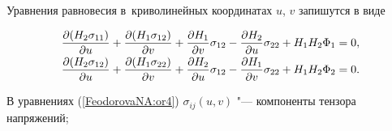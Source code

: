 


\date{25/VI/2010} %









\maketitle






Уравнения равновесия в~криволинейных координатах $u$, $v$ запишутся в виде

\cite{FeodorovaNA:Lyv}

\begin{equation}

\label{FeodorovaNA:or4}

\begin{array}{c} \displaystyle

 \frac{\partial(H_2\sigma_{11})}{\partial

u}+\frac{\partial(H_1\sigma_{12})}{\partial v}+\frac{\partial

H_1}{\partial v}\sigma_{12}-\frac{\partial H_2}{\partial

u}\sigma_{22}+H_1H_2\Phi_1=0, \vspace{1mm} \\

\displaystyle

\frac{\partial(H_2\sigma_{12})}{\partial

u}+\frac{\partial(H_1\sigma_{22})}{\partial v}+\frac{\partial

H_2}{\partial u}\sigma_{12}-\frac{\partial H_1}{\partial

v}\sigma_{22}+H_1H_2\Phi_2=0.

\end{array}

\end{equation}

В уравнениях (\ref{FeodorovaNA:or4}) $\sigma_{ij}(u,v)$ "--- компоненты тензора напряжений;

